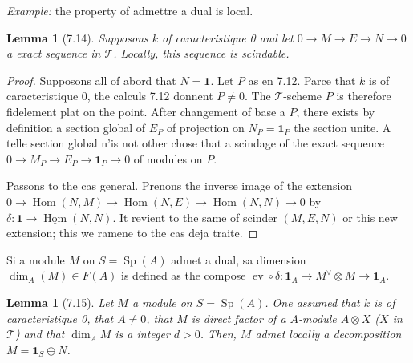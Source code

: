 \documentclass[12pt,a4paper]{article}
\theoremstyle{plain}
\newtheorem{lemma}[theorem]{Lemma}
\theoremstyle{definition}
\DeclareMathOperator{\Sp}{Sp}
\DeclareMathOperator{\Hom}{Hom}
\DeclareMathOperator{\ev}{ev}
\begin{document}
\textit{Example:} the property of admettre a dual is local.

\begin{lemma}[7.14]
Supposons $k$ of caracteristique 0 and let $0 \to M \to E \to N \to 0$ a exact sequence in $\mathcal{T}$. Locally, this sequence is scindable.
\end{lemma}

\begin{proof}
Supposons all of abord that $N = \mathbf{1}$. Let $P$ as en 7.12. Parce that $k$ is of caracteristique 0, the calculs 7.12 donnent $P \neq 0$. The $\mathcal{T}$-scheme $P$ is therefore fidelement plat on the point. After changement of base a $P$, there exists by definition a section global of $E_P$ of projection on $N_P = \mathbf{1}_P$ the section unite. A telle section global n'is not other chose that a scindage of the exact sequence $0 \to M_P \to E_P \to \mathbf{1}_P \to 0$ of modules on $P$.

Passons to the cas general. Prenons the inverse image of the extension $0 \to \underline{\Hom}(N, M) \to \underline{\Hom}(N, E) \to \underline{\Hom}(N, N) \to 0$ by $\delta : \mathbf{1} \to \underline{\Hom}(N, N)$. It revient to the same of scinder $(M, E, N)$ or this new extension; this we ramene to the cas deja traite.
\end{proof}

Si a module $M$ on $S = \Sp(A)$ admet a dual, sa dimension $\dim_A(M) \in F(A)$ is defined as the compose $\ev \circ \delta : \mathbf{1}_A \to M^\vee \otimes M \to \mathbf{1}_A$.

\begin{lemma}[7.15]
Let $M$ a module on $S = \Sp(A)$. One assumed that $k$ is of caracteristique 0, that $A \neq 0$, that $M$ is direct factor of a $A$-module $A \otimes X$ ($X$ in $\mathcal{T}$) and that $\dim_A M$ is a integer $d > 0$. Then, $M$ admet locally a decomposition $M = \mathbf{1}_S \oplus N$.
\end{lemma}
\end{document}
